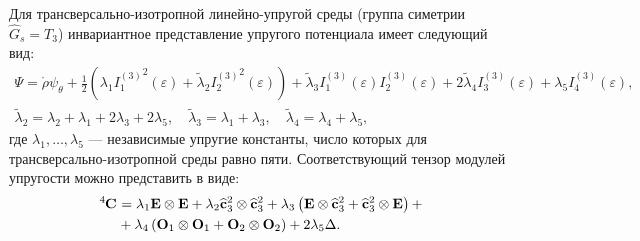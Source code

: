 

Для трансверсально-изотропной линейно-упругой среды (группа симетрии $\hat{G}_{s} = T_3$) инвариантное представление упругого потенциала имеет следующий вид:
\begin{gather}
	\Psi = \mathring{\rho} \psi_\theta + \frac{1}{2} \left(\lambda_1 {I^{(3)}_1}^2(\varepsilon) + \widetilde{\lambda}_2 {I^{(3)}_2}^2(\varepsilon)\right) + \widetilde{\lambda}_3 I^{(3)}_{1}(\varepsilon)I^{(3)}_2(\varepsilon) + 2 \widetilde{\lambda}_4 I^{(3)}_3(\varepsilon) + \lambda_5 I_4^{(3)}(\varepsilon), \\
	\widetilde{\lambda}_2 = \lambda_2 + \lambda_1 + 2 \lambda_3 + 2 \lambda_5, \quad \widetilde{\lambda}_3 = \lambda_1 + \lambda_3, \quad \widetilde{\lambda}_4 = \lambda_4 + \lambda_5,\nonumber
\end{gather}
где $\lambda_1, \dots, \lambda_5$ --- независимые упругие константы, число которых для трансверсально-изотропной среды равно пяти. Соответствующий тензор модулей упругости можно представить в виде:
\begin{align}
	\tensor[^4]{\mathbf{C}}{} &= \lambda_1 \mathbf{E} \otimes \mathbf{E} + \lambda_2 \widehat{\mathbf{c}}^2_3 \otimes \widehat{\mathbf{c}}^2_3 + \lambda_3 \left(\mathbf{E} \otimes \widehat{\mathbf{c}}^2_3 + \widehat{\mathbf{c}}^2_3 \otimes \mathbf{E}\right) + \\ &+ \lambda_4 \left(\mathbf{O}_1 \otimes \mathbf{O}_1 + \mathbf{O}_2 \otimes \mathbf{O}_2\right) + 2 \lambda_5 \Delta.\nonumber 
\end{align}

